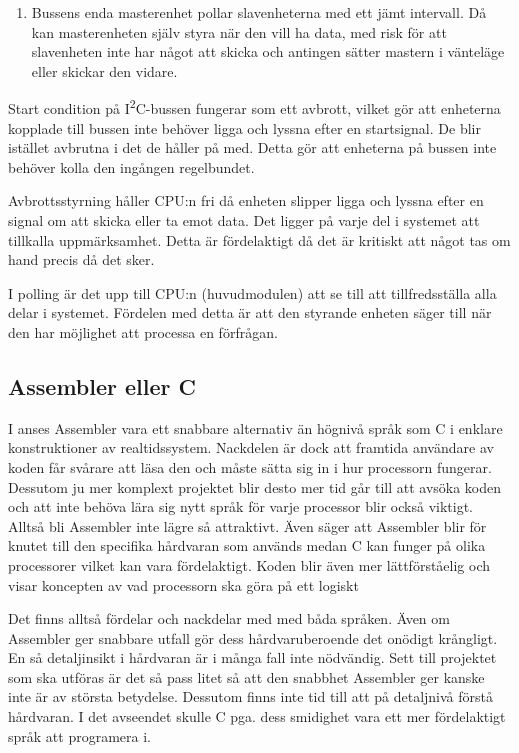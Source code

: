 \documentclass[11pt]{article}
\begin{document}
\begin{flushleft}
\begin{enumerate}
 \item Bussens enda masterenhet pollar slavenheterna med ett jämt intervall. Då kan masterenheten själv styra när den vill ha data, med risk för att slavenheten inte har något att skicka och antingen sätter mastern i vänteläge eller skickar den vidare.
\end{enumerate}


Start condition på I\textsuperscript{2}C-bussen fungerar som ett avbrott, vilket gör att enheterna kopplade till bussen inte behöver ligga och lyssna efter en startsignal. De blir istället avbrutna i det de håller på med. Detta gör att enheterna på bussen inte behöver kolla den ingången regelbundet. 


Avbrottsstyrning håller CPU:n fri då enheten slipper ligga och lyssna efter en signal om att skicka eller ta emot data. Det ligger på varje del i systemet att tillkalla uppmärksamhet. Detta är fördelaktigt då det är kritiskt att något tas om hand precis då det sker.

I polling är det upp till CPU:n (huvudmodulen) att se till att tillfredsställa alla delar i systemet. Fördelen med detta är att den styrande enheten säger till när den har möjlighet att processa en förfrågan.

\subsection{Assembler eller C}

I \cite{RWD} anses Assembler vara ett snabbare alternativ än högnivå språk som C i enklare konstruktioner av realtidssystem. Nackdelen är dock att framtida användare av koden får svårare att läsa den och måste sätta sig in i hur processorn fungerar. Dessutom ju mer komplext projektet blir desto mer tid går till att avsöka koden och att inte behöva lära sig nytt språk för varje processor blir också viktigt. Alltså bli Assembler inte lägre så attraktivt. Även \cite{CPM} säger att Assembler blir för knutet till den specifika hårdvaran som används medan C kan funger på olika processorer vilket kan vara fördelaktigt. Koden blir även mer lättförståelig och visar koncepten av vad processorn ska göra på ett logiskt 

Det finns alltså fördelar och nackdelar med med båda språken. Även om Assembler ger snabbare utfall gör dess hårdvaruberoende det onödigt krångligt. En så detaljinsikt i hårdvaran är i många fall inte nödvändig. Sett till projektet som ska utföras är det så pass litet så att den snabbhet Assembler ger kanske inte är av största betydelse. Dessutom finns inte tid till att på detaljnivå förstå hårdvaran. I det avseendet skulle C pga. dess smidighet vara ett mer fördelaktigt språk att programera i. 


\end{flushleft}
\end{document}

